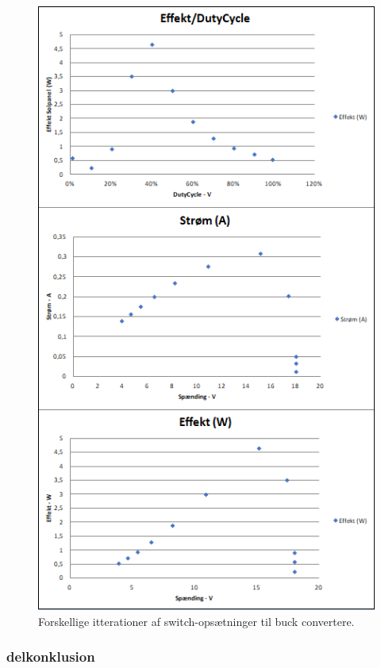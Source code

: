 \documentclass[../main.tex]{subfiles}
\begin{document}
            \begin{figure}[H]
            \includegraphics[scale = 0.7]{Dokumentation/Figures/PV_buckHardwareTest.png}
            \caption{Forskellige itterationer af switch-opsætninger til buck convertere.}
            \label{fig: Switch designs}
            \end{figure}
            
            
        \subsubsection{delkonklusion}
            
            
\end{document}
